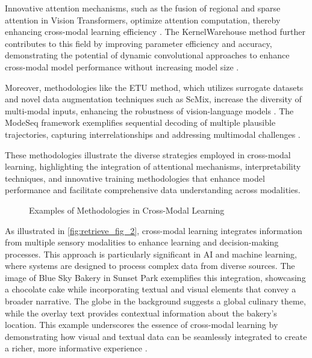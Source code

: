 Innovative attention mechanisms, such as the fusion of regional and sparse attention in Vision Transformers, optimize attention computation, thereby enhancing cross-modal learning efficiency \cite{ibtehaz2024fusionregionalsparseattention}. The KernelWarehouse method further contributes to this field by improving parameter efficiency and accuracy, demonstrating the potential of dynamic convolutional approaches to enhance cross-modal model performance without increasing model size \cite{li2023kernelwarehouseparameterefficientdynamicconvolution}.

Moreover, methodologies like the ETU method, which utilizes surrogate datasets and novel data augmentation techniques such as ScMix, increase the diversity of multi-modal inputs, enhancing the robustness of vision-language models \cite{zhang2024universaladversarialperturbationsvisionlanguage}. The ModeSeq framework exemplifies sequential decoding of multiple plausible trajectories, capturing interrelationships and addressing multimodal challenges \cite{zhou2024modeseqtamingsparsemultimodal}.

These methodologies illustrate the diverse strategies employed in cross-modal learning, highlighting the integration of attentional mechanisms, interpretability techniques, and innovative training methodologies that enhance model performance and facilitate comprehensive data understanding across modalities.

\begin{figure}[ht!]
\centering
{}\hspace{0.03\textwidth}
\caption{Examples of Methodologies in Cross-Modal Learning}\label{fig:retrieve_fig_2}
\end{figure}

As illustrated in \autoref{fig:retrieve_fig_2}, cross-modal learning integrates information from multiple sensory modalities to enhance learning and decision-making processes. This approach is particularly significant in AI and machine learning, where systems are designed to process complex data from diverse sources. The image of Blue Sky Bakery in Sunset Park exemplifies this integration, showcasing a chocolate cake while incorporating textual and visual elements that convey a broader narrative. The globe in the background suggests a global culinary theme, while the overlay text provides contextual information about the bakery's location. This example underscores the essence of cross-modal learning by demonstrating how visual and textual data can be seamlessly integrated to create a richer, more informative experience \cite{BLIP:Boots7}.

